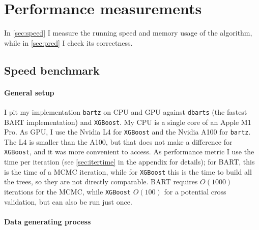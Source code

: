 \documentclass{article}
\let\oldmarginpar\marginpar
\renewcommand{\marginpar}[1]{\oldmarginpar{\sffamily\scriptsize #1}}
\renewcommand{\marginpar}[1]{\relax} %
\begin{document}
    \section{Performance measurements}
    \label{sec:perf}

    In \autoref{sec:speed} I measure the running speed and memory usage of the algorithm, while in \autoref{sec:pred} I check its correctness.

    \subsection{Speed benchmark}
    \label{sec:speed}

    \paragraph{General setup}

    I pit my implementation \texttt{bartz} on CPU and GPU against \texttt{dbarts} (the fastest BART implementation) and \texttt{XGBoost}.\marginpar{Add XBART} My CPU is a single core of an Apple M1 Pro. As GPU, I use the Nvidia L4 for \texttt{XGBoost} and the Nvidia A100 for \texttt{bartz}. The L4 is smaller than the A100, but that does not make a difference for \texttt{XGBoost}, and it was more convenient to access. As performance metric I use the time per iteration (see \autoref{sec:itertime} in the appendix for details); for BART, this is the time of a MCMC iteration, while for \texttt{XGBoost} this is the time to build all the trees, so they are not directly comparable. BART requires $O(1000)$ iterations for the MCMC, while \texttt{XGBoost} $O(100)$ for a potential cross validation, but can also be run just once.

    \paragraph{Data generating process}
\end{document}
